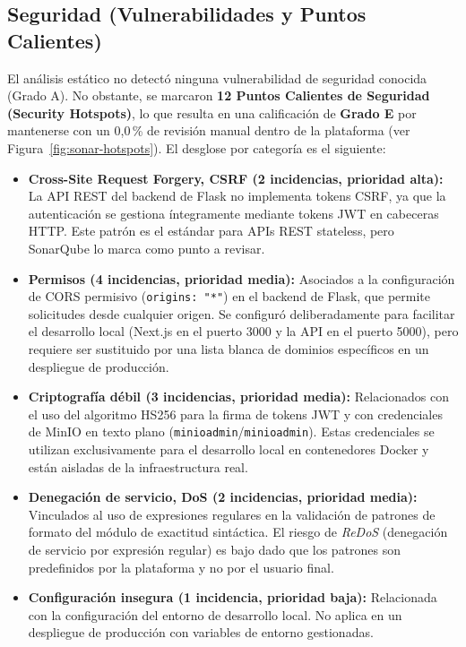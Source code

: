 \subsection{Seguridad (Vulnerabilidades y Puntos Calientes)}
El análisis estático no detectó ninguna vulnerabilidad de seguridad conocida (Grado A). No obstante, se marcaron \textbf{12 Puntos Calientes de Seguridad (Security Hotspots)}, lo que resulta en una calificación de \textbf{Grado E} por mantenerse con un 0,0\,\% de revisión manual dentro de la plataforma (ver Figura~\ref{fig:sonar-hotspots}). El desglose por categoría es el siguiente:
\begin{itemize}
  \item \textbf{Cross-Site Request Forgery, CSRF (2 incidencias, prioridad alta):} La API REST del backend de Flask no implementa tokens CSRF, ya que la autenticación se gestiona íntegramente mediante tokens \ac{JWT} en cabeceras HTTP. Este patrón es el estándar para APIs REST stateless, pero SonarQube lo marca como punto a revisar.
  \item \textbf{Permisos (4 incidencias, prioridad media):} Asociados a la configuración de CORS permisivo (\texttt{origins: "*"}) en el backend de Flask, que permite solicitudes desde cualquier origen. Se configuró deliberadamente para facilitar el desarrollo local (Next.js en el puerto 3000 y la API en el puerto 5000), pero requiere ser sustituido por una lista blanca de dominios específicos en un despliegue de producción.
  \item \textbf{Criptografía débil (3 incidencias, prioridad media):} Relacionados con el uso del algoritmo HS256 para la firma de tokens \ac{JWT} y con credenciales de MinIO en texto plano (\texttt{minioadmin}/\texttt{minioadmin}). Estas credenciales se utilizan exclusivamente para el desarrollo local en contenedores Docker y están aisladas de la infraestructura real.
  \item \textbf{Denegación de servicio, DoS (2 incidencias, prioridad media):} Vinculados al uso de expresiones regulares en la validación de patrones de formato del módulo de exactitud sintáctica. El riesgo de \emph{ReDoS} (denegación de servicio por expresión regular) es bajo dado que los patrones son predefinidos por la plataforma y no por el usuario final.
  \item \textbf{Configuración insegura (1 incidencia, prioridad baja):} Relacionada con la configuración del entorno de desarrollo local. No aplica en un despliegue de producción con variables de entorno gestionadas.
\end{itemize}

